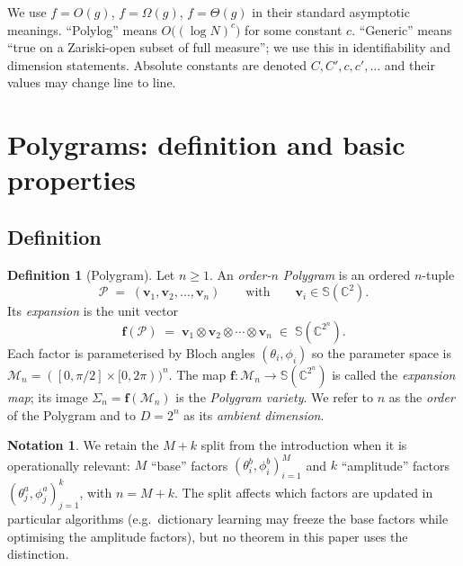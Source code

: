 \documentclass[11pt,letterpaper]{article}
\theoremstyle{definition}
\newtheorem{definition}[theorem]{Definition}
\newtheorem*{notation}{Notation}
\newcommand{\C}{\mathbb{C}}
\newcommand{\Sphere}{\mathbb{S}}
\newcommand{\Polygram}{\mathcal{P}}
\newcommand{\Mset}{\mathcal{M}}
\begin{document}
We use $f = O(g)$, $f = \Omega(g)$, $f = \Theta(g)$ in their standard
asymptotic meanings. ``Polylog'' means $O\big((\log N)^{c}\big)$ for some
constant $c$. ``Generic'' means ``true on a Zariski-open subset of full
measure''; we use this in identifiability and dimension statements. Absolute
constants are denoted $C, C', c, c', \dots$ and their values may change line to
line.

\section{Polygrams: definition and basic properties}
\label{sec:basic}

\subsection{Definition}

\begin{definition}[Polygram]
\label{def:polygram}
Let $n \geq 1$. An \emph{order-$n$ Polygram} is an ordered $n$-tuple
\[
\Polygram \;=\; (\bm{v}_{1}, \bm{v}_{2}, \dots, \bm{v}_{n})
\qquad \text{with} \qquad \bm{v}_{i} \in \Sphere(\C^{2}).
\]
Its \emph{expansion} is the unit vector
\[
\bm{f}(\Polygram) \;=\; \bm{v}_{1} \otimes \bm{v}_{2} \otimes \cdots \otimes
\bm{v}_{n} \;\in\; \Sphere(\C^{2^{n}}).
\]
Each factor is parameterised by Bloch angles $(\theta_{i}, \phi_{i})$ so the
parameter space is $\Mset_{n} = ([0, \pi/2] \times [0, 2\pi))^{n}$. The map
$\bm{f} : \Mset_{n} \to \Sphere(\C^{2^{n}})$ is called the \emph{expansion
map}; its image $\Sigma_{n} = \bm{f}(\Mset_{n})$ is the \emph{Polygram
variety}. We refer to $n$ as the \emph{order} of the Polygram and to $D = 2^{n}$
as its \emph{ambient dimension}.
\end{definition}

\begin{notation}
We retain the $M + k$ split from the introduction when it is operationally
relevant: $M$ ``base'' factors $(\theta_{i}^{b}, \phi_{i}^{b})_{i=1}^{M}$ and
$k$ ``amplitude'' factors $(\theta_{j}^{a}, \phi_{j}^{a})_{j=1}^{k}$, with
$n = M + k$. The split affects which factors are updated in particular
algorithms (e.g.\ dictionary learning may freeze the base factors while
optimising the amplitude factors), but no theorem in this paper uses the
distinction.
\end{notation}
\end{document}

